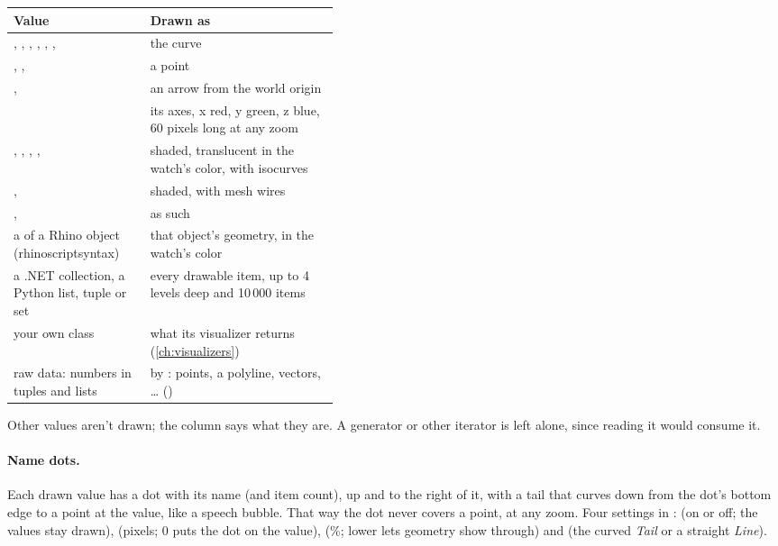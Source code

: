 \begin{xltabular}{\linewidth}{@{}P{0.42\linewidth}L@{}}
\toprule
\textsf{\textbf{Value}} & \textsf{\textbf{Drawn as}} \\ \midrule
{}, , , , , ,  & the curve \\
, ,  & a point \\
,  & an arrow from the world origin \\
 & its axes, x red, y green, z blue, 60 pixels long at any zoom \\
, , , ,  & shaded, translucent in the watch's color, with isocurves \\
,  & shaded, with mesh wires \\
,  & as such \\
a  of a Rhino object (rhinoscriptsyntax) & that object's geometry, in the watch's color \\
a .NET collection, a Python list, tuple or set & every drawable item, up to 4 levels deep and 10\,000 items \\
your own class & what its visualizer returns (\cref{ch:visualizers}) \\
raw data: numbers in tuples and lists & by : points, a polyline, vectors, … () \\
\bottomrule
\end{xltabular}

Other values aren't drawn; the  column says what they are. A generator or other iterator
is left alone, since reading it would consume it.

\paragraph{Name dots.} Each drawn value has a dot with its name (and item count), up and to the right of
it, with a tail that curves down from the dot's bottom edge to a point at the value, like a speech
bubble. That way the dot never covers a point, at any zoom. Four settings in
:  (on or off; the values stay drawn),
 (pixels; 0 puts the dot on the value),  (\%; lower
lets geometry show through) and  (the curved \emph{Tail} or a straight \emph{Line}).

